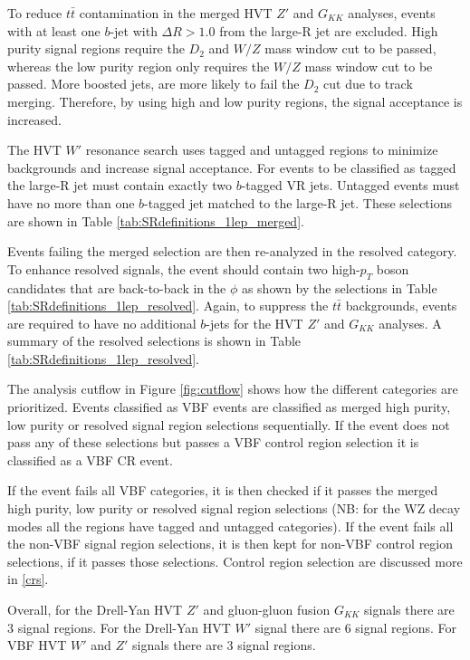 To reduce $t\bar{t}$ contamination in the merged HVT $Z'$ and $G_{KK}$ analyses, events with at least one $b$-jet with $\Delta R > 1.0$ from the large-R jet are excluded. High purity signal regions require the $D_{2}$ and $W/Z$ mass window cut to be passed, whereas the low purity region only requires the  $W/Z$ mass window cut to be passed. More boosted jets, are more likely to fail the $D_{2}$ cut due to track merging. Therefore, by using high and low purity regions, the signal acceptance is increased. 

The HVT $W'$ resonance search uses tagged and untagged regions to minimize backgrounds and increase signal acceptance. For events to be classified as tagged the large-R jet must contain exactly two $b$-tagged VR jets. Untagged events must have no more than one $b$-tagged jet matched to the large-R jet. These selections are shown in Table \ref{tab:SRdefinitions_1lep_merged}. 

Events failing the merged selection are then re-analyzed in the resolved category. To enhance resolved signals, the event should contain two high-$p_{T}$ boson candidates that are back-to-back in the $\phi$ as shown by the selections in Table \ref{tab:SRdefinitions_1lep_resolved}. Again, to suppress the $t\bar{t}$ backgrounds, events are required to have no additional $b$-jets for the HVT $Z'$ and $G_{KK}$ analyses. A summary of the resolved selections is shown in Table \ref{tab:SRdefinitions_1lep_resolved}.

The analysis cutflow in Figure \ref{fig:cutflow} shows how the different categories are prioritized. Events classified as VBF events are classified as merged high purity, low purity or resolved signal region selections sequentially. If the event does not pass any of these selections but passes a VBF control region selection it is classified as a VBF CR event. 

If the event fails all VBF categories, it is then checked if it passes the merged high purity, low purity or resolved signal region selections (NB: for the WZ decay modes all the regions have tagged and untagged categories). If the event fails all the non-VBF signal region selections, it is then kept for non-VBF control region selections, if it passes those selections. Control region selection are discussed more in \ref{crs}.

Overall, for the Drell-Yan HVT $Z'$ and gluon-gluon fusion $G_{KK}$ signals there are 3 signal regions. For the Drell-Yan HVT $W'$ signal there are 6 signal regions. For VBF HVT $W'$ and $Z'$ signals there are 3 signal regions.


